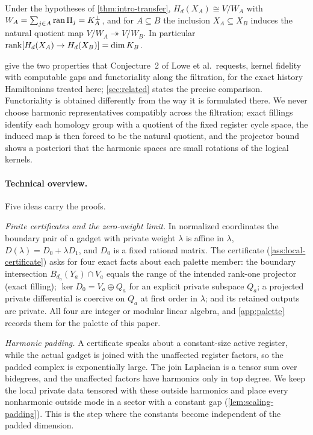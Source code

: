 \begin{theorem}
\label{thm:intro-quotient}
Under the hypotheses of \cref{thm:intro-transfer}, \(H_d(X_A)\cong V/W_A\) with \(W_A=\sum_{j\in A}\operatorname{ran}\Pi_j=K_A^\perp\), and for \(A\subseteq B\) the inclusion \(X_A\subseteq X_B\) induces the natural quotient map \(V/W_A\twoheadrightarrow V/W_B\). In particular \(\operatorname{rank}[H_d(X_A)\to H_d(X_B)]=\dim K_B\).
\end{theorem}

 give the two properties that Conjecture~2 of Lowe et al.\ requests, kernel fidelity with computable gaps and functoriality along the filtration, for the exact history Hamiltonians treated here; \cref{sec:related} states the precise comparison. Functoriality is obtained differently from the way it is formulated there. We never choose harmonic representatives compatibly across the filtration; exact fillings identify each homology group with a quotient of the fixed register cycle space, the induced map is then forced to be the natural quotient, and the projector bound shows a posteriori that the harmonic spaces are small rotations of the logical kernels.

\paragraph{Technical overview.}
Five ideas carry the proofs.

\emph{Finite certificates and the zero-weight limit.} In normalized coordinates the boundary pair of a gadget with private weight \(\lambda\) is affine in \(\lambda\), \(D(\lambda)=D_0+\lambda D_1\), and \(D_0\) is a fixed rational matrix. The certificate (\cref{ass:local-certificate}) asks for four exact facts about each palette member: the boundary intersection \(B_{d_a}(Y_a)\cap V_a\) equals the range of the intended rank-one projector (exact filling); \(\ker D_0=V_a\oplus Q_a\) for an explicit private subspace \(Q_a\); a projected private differential is coercive on \(Q_a\) at first order in \(\lambda\); and its retained outputs are private. All four are integer or modular linear algebra, and \cref{app:palette} records them for the palette of this paper.

\emph{Harmonic padding.} A certificate speaks about a constant-size active register, while the actual gadget is joined with the unaffected register factors, so the padded complex is exponentially large. The join Laplacian is a tensor sum over bidegrees, and the unaffected factors have harmonics only in top degree. We keep the local private data tensored with these outside harmonics and place every nonharmonic outside mode in a sector with a constant gap (\cref{lem:scaling-padding}). This is the step where the constants become independent of the padded dimension.

